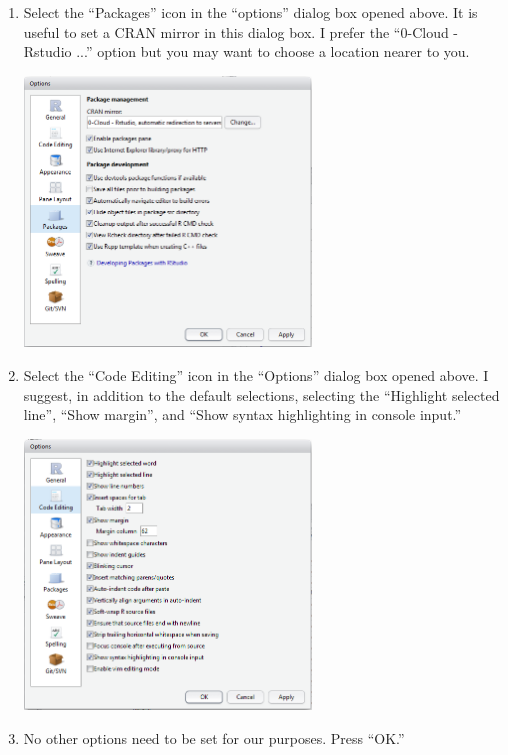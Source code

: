\documentclass{article}\usepackage[]{graphicx}\usepackage[]{color}
\begin{document}
\begin{enumerate}
  \item Select the ``Packages'' icon in the ``options'' dialog box opened above.  It is useful to set a CRAN mirror in this dialog box.  I prefer the ``0-Cloud - Rstudio ...'' option but you may want to choose a location nearer to you.
\begin{center}
  \includegraphics[width=3in]{Figs/RStudio_Prep_OptionsCRAN.png}
\end{center}

  \newpage
\item Select the ``Code Editing'' icon in the ``Options'' dialog box opened above.  I suggest, in addition to the default selections, selecting the ``Highlight selected line'', ``Show margin'', and ``Show syntax highlighting in console input.''
\begin{center}
  \includegraphics[width=3in]{Figs/RStudio_Prep_OptionsCodeEditing.png}
\end{center}

  \item No other options need to be set for our purposes.  Press ``OK.''
\end{enumerate}
\end{document}
